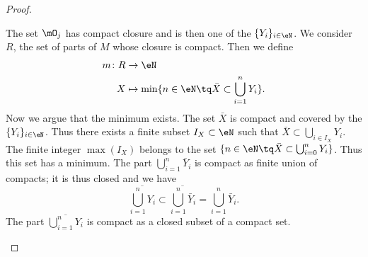 \begin{proof}
\begin{subproof}
		The set \( \mO_j\) has compact closure and is then one of the \( \{ Y_i \}_{i\in \eN}\).
		We consider \( R\), the set of parts of \( M\) whose closure is compact. Then we define
		\begin{equation}
			\begin{aligned}
				m\colon R & \to \eN                                                         \\
				X         & \mapsto \min\{ n\in \eN\tq \bar X\subset \bigcup_{i=1}^nY_i \}.
			\end{aligned}
		\end{equation}
		Now we argue that the minimum exists. The set \( \bar X\) is compact and covered by the \( \{ Y_i \}_{i\in \eN}\). Thus there exists a finite subset \( I_X\subset \eN\) such that \( \bar X\subset\bigcup_{i\in I_X}Y_i\). The finite integer \( \max(I_X)\) belongs to the set \( \{ n\in \eN\tq \bar X\subset\bigcup_{i=0}^nY_i \}\). Thus this set has a minimum.
				\label{SPITEMooJGIXooJPVzjP}
		The part \( \bigcup_{i=1}^n\bar Y_i\) is compact as finite union of compacts; it is thus closed and we have
		\begin{equation}
			\overline{\bigcup_{i=1}^nY_i}\subset\overline{  \bigcup_{i=1}^n\bar Y_i  }=\bigcup_{i=1}^n\bar Y_i.
		\end{equation}
		The part \( \overline{    \bigcup_{i=1}^nY_i   }\) is compact as a closed subset of a compact set.


\end{subproof}
\end{proof}
